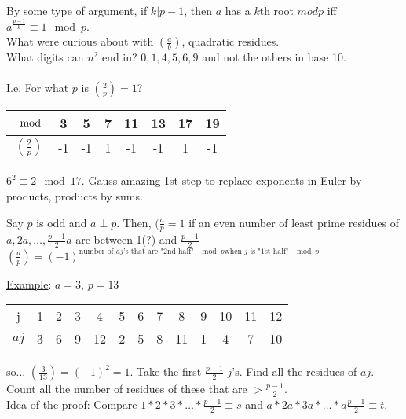   By some type of argument, if $k | p -1$, then $a$ has a $k$th root $mod p$
  iff $a^{\frac{p-1}{k} } \equiv 1 \mod p$.\\
  What were curious about with $(\frac{a}{b})$, quadratic residues.\\
  What digits can $n^2$ end in? $0, 1, 4, 5, 6, 9$ and not the others in base
  10.\\\\
  I.e. For what $p$ is $(\frac{2}{p}) = 1$?\\
  \begin{tabular}{c | c c c c c c c}
    $\mod$& 3 & 5 & 7 & 11 & 13 & 17 & 19\\
    \hline
    $(\frac{2}{p})$ & -1 & -1 & 1 & -1 & -1 & 1 & -1
  \end{tabular}
  $6^2 \equiv 2 \mod 17$.
  Gauss amazing 1st step to replace exponents in Euler by products, products
  by sums.\\
  \begin{lemma}
    Say $p$ is odd and $a \perp p$. Then, $(\frac{a}{p} = 1$ if an even number
    of least prime residues of $a, 2a, \ldots, \frac{p-1}{2}a$ are between
    1(?) and $\frac{p-1}{2}$\\
    $(\frac{a}{p}) = (-1)^{\text{number of $aj$'s that are "2nd half" $\mod p$
    when $j$ is "1st half" $\mod p$}}$
  \end{lemma}
  \underline{Example}: $a = 3$, $p = 13$\\
  \begin{tabular}{c | c   c   c   c   c   c   c  c  c   c   c   c}
    j & 1 & 2 & 3 & 4 & 5 & 6 & 7 & 8 & 9 & 10 & 11 & 12\\
    $aj$ & 3 & 6 & 9 & 12 & 2 & 5 & 8 & 11 & 1 & 4 & 7 & 10\\
  \end{tabular}
  so... $(\frac{3}{13}) = (-1)^2 = 1$.
  Take the first $\frac{p-1}{2}$ $j$'s. Find all the residues of $aj$.
  Count all the number of residues of these that are $> \frac{p-1}{2}$.\\
  Idea of the proof: Compare $1 * 2 * 3 * \ldots * \frac{p-1}{2} \equiv s$ and
  $a * 2a * 3a * \ldots * a\frac{p-1}{2} \equiv t$.\\

